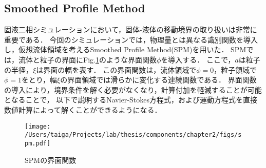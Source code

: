 \subsection{Smoothed Profile Method}
固液二相シミュレーションにおいて，固体-液体の移動境界の取り扱いは非常に重要である．
今回のシミュレーションでは，物理量とは異なる識別関数を導入し，仮想流体領域を考えるSmoothed Profile Method(SPM)\cite{}を用いた．
SPMでは，流体と粒子の界面にFig.\ref{fig:spm_function}のような界面関数$\phi$を導入する．
ここで，$a$は粒子の半径，$\xi$は界面の幅を表す．
この界面関数は，流体領域で$\phi=0$，粒子領域で$\phi=1$をとり，幅$\xi$の界面領域では滑らかに変化する連続関数である．
界面関数の導入により，境界条件を解く必要がなくなり，計算付加を軽減することが可能となることで，
以下で説明するNavier-Stokes方程式，および運動方程式を直接数値計算によって解くことができるようになる．

    \begin{figure}[H]
        \centering
        \texttt{[image: /Users/taiga/Projects/lab/thesis/components/chapter2/figs/spm.pdf]}
        \caption{SPMの界面関数}
        \label{fig:spm_function}
    \end{figure}

